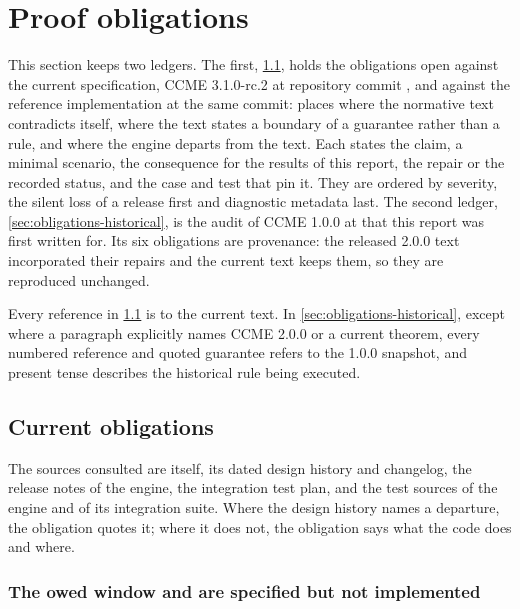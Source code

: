 \section{Proof obligations}
\label{sec:obligations}

This section keeps two ledgers. The first, \cref{sec:obligations-current},
holds the obligations open against the current specification, CCME
3.1.0-rc.2 at repository commit , and against the reference
implementation at the same commit: places where the normative text
contradicts itself, where the text states a boundary of a guarantee rather
than a rule, and where the engine departs from the text. Each states the
claim, a minimal scenario, the consequence for the results of this report, the
repair or the recorded status, and the case and test that pin it. They are
ordered by severity, the silent loss of a release first and diagnostic
metadata last. The second ledger, \cref{sec:obligations-historical}, is the
audit of CCME 1.0.0 at  that this report was first written for.
Its six obligations are provenance: the released 2.0.0 text incorporated
their repairs and the current text keeps them, so they are reproduced
unchanged.

Every \SPEC{} reference in \cref{sec:obligations-current} is to the current
text. In \cref{sec:obligations-historical}, except where a paragraph
explicitly names CCME 2.0.0 or a current theorem, every numbered reference
and quoted guarantee refers to the 1.0.0 snapshot, and present tense
describes the historical rule being executed.

\subsection{Current obligations}
\label{sec:obligations-current}

The sources consulted are \SPEC{} itself, its dated design history and
changelog, the release notes of the engine, the integration test plan, and
the test sources of the engine and of its integration suite. Where the design
history names a departure, the obligation quotes it; where it does not, the
obligation says what the code does and where.

\subsubsection{The owed window and  are specified but not implemented}

